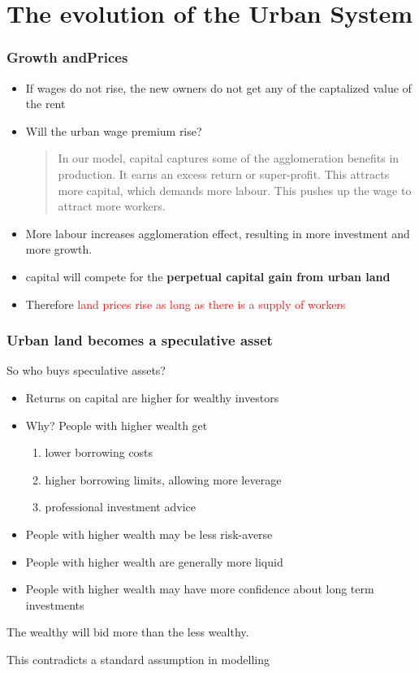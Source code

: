 \documentclass[notes]{beamer}
\begin{document}
\section{The evolution of the Urban System}%
\begin{frame}\frametitle{Growth andPrices }

\begin{itemize}
\item If wages do not rise, the new owners do not get any of the captalized value of the rent

\item  Will the urban wage premium rise? 
	\begin{quotation}
	In our model, capital captures some of the agglomeration benefits in production. It earns an excess return or super-profit. This attracts more capital, which demands more labour. This pushes up the wage to attract more workers. 
	\end{quotation}
	
\item More labour increases agglomeration effect, resulting in more investment and  more growth. 
\item capital will compete for the \textbf{perpetual capital gain from urban  land} 


\pause
\item Therefore \textcolor{red}{land prices rise as long as there is a  supply of workers}
\end{itemize}


\end{frame}
\begin{frame}\frametitle{Urban land becomes a \textbf{speculative asset} }
So who buys speculative assets?
 \pause
 
\begin{itemize}
\item {\Large Returns on capital are higher for wealthy investors}
\item Why? People with higher wealth get 
	\begin{enumerate}
	\item lower borrowing costs
	\item higher borrowing limits,  allowing more leverage
	\item professional investment advice
	\end{enumerate}
\item People with higher wealth may be less risk-averse 
\item People with higher wealth are generally more liquid 
\item People with higher wealth may have more confidence about long term investments
\end{itemize}

\Large The wealthy will bid more than the less wealthy.

\tiny This contradicts a standard assumption in modelling


\end{frame}
\end{document}
